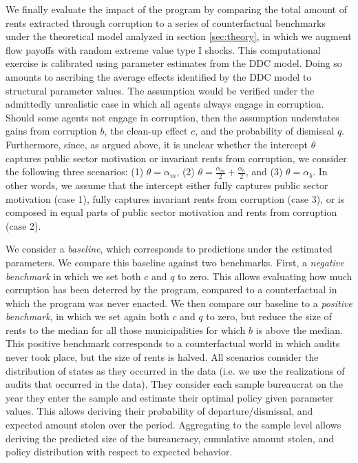{We finally evaluate the impact of the program by comparing the total amount of rents extracted through corruption to a series of counterfactual benchmarks under the theoretical model analyzed in section \ref{sec:theory}, in which we augment flow payoffs with random extreme value type I shocks. This computational exercise is calibrated using parameter estimates from the DDC model. Doing so amounts to ascribing the average effects identified by the DDC model to structural parameter values. The assumption would be verified under the admittedly unrealistic case in which all agents always engage in corruption.  Should some agents not engage in corruption, then the assumption understates gains from corruption $b$, the clean-up effect $c$, and the probability of dismissal $q$. Furthermore, since, as argued above, it is unclear whether the intercept $\theta$ captures public sector motivation or invariant rents from corruption, we consider the following three scenarios: (1) $\theta = \alpha_m$, (2) $\theta = \frac{\alpha_m}{2} + \frac{\alpha_b}{2}$, and (3) $\theta = \alpha_b$. In other words, we assume that the intercept either fully captures public sector motivation (case 1), fully captures invariant rents from corruption (case 3), or is composed in equal parts of public sector motivation and rents from corruption (case 2). 

We consider a \emph{baseline}, which corresponds to predictions under the estimated parameters. We compare this baseline against two benchmarks. First, a \emph{negative benchmark} in which we set both $c$ and $q$ to zero. This allows evaluating how much corruption has been deterred by the program, compared to a counterfactual in which the program was never enacted. We then compare our baseline to a \emph{positive benchmark}, in which we set again both $c$ and $q$ to zero, but reduce the size of rents to the median for all those municipalities for which $b$ is above the median. This positive benchmark corresponds to a counterfactual world in which audits never took place, but the size of rents is halved. All scenarios consider the distribution of states as they occurred in the data (i.e. we use the realizations of audits that occurred in the data). They consider each sample bureaucrat on the year they enter the sample and estimate their optimal policy given parameter values. This allows deriving their probability of departure/dismissal, and expected amount stolen over the period. Aggregating to the sample level allows deriving the predicted size of the bureaucracy, cumulative amount stolen, and policy distribution with respect to expected behavior.

}
